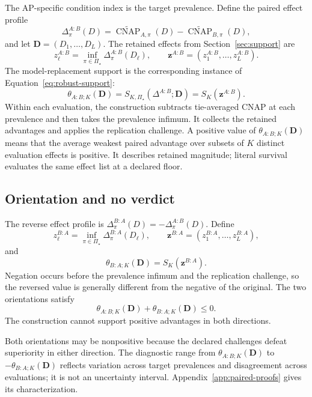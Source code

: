 \documentclass[11pt]{article}
\newcommand{\CNAP}{\operatorname{CNAP}}
\newcommand{\PSet}{\Pi_\star}
\newcommand{\CNAPta}{\widetilde{\CNAP}}
\theoremstyle{remark}
\begin{document}
The AP-specific condition index is the target prevalence. Define the paired effect profile
\[
\Delta^{A:B}_\pi(D)
=
\CNAPta_{A,\pi}(D)
-
\CNAPta_{B,\pi}(D),
\]
and let $\mathbf D=(D_1,\ldots,D_L)$. The retained effects from Section~\ref{sec:support} are
\[
z_\ell^{A:B}
=
\inf_{\pi\in\PSet}\Delta^{A:B}_\pi(D_\ell),
\qquad
\mathbf z^{A:B}
=
(z_1^{A:B},\ldots,z_L^{A:B}).
\]
The model-replacement support is the corresponding instance of Equation~\eqref{eq:robust-support}:
\begin{equation}
\theta_{A:B;K}(\mathbf D)
=
S_{K,\PSet}\!\left(\Delta^{A:B};\mathbf D\right)
=
S_K\!\left(\mathbf z^{A:B}\right).
\label{eq:paired-estimand}
\end{equation}
Within each evaluation, the construction subtracts tie-averaged CNAP at each prevalence and then takes the prevalence infimum. It collects the retained advantages and applies the replication challenge. A positive value of $\theta_{A:B;K}(\mathbf D)$ means that the average weakest paired advantage over subsets of $K$ distinct evaluation effects is positive. It describes retained magnitude; literal survival evaluates the same effect list at a declared floor.

\subsection{Orientation and no verdict}

The reverse effect profile is $\Delta^{B:A}_\pi(D)=-\Delta^{A:B}_\pi(D)$. Define
\[
z_\ell^{B:A}
=
\inf_{\pi\in\PSet}\Delta^{B:A}_\pi(D_\ell),
\qquad
\mathbf z^{B:A}
=
(z_1^{B:A},\ldots,z_L^{B:A}),
\]
and
\[
\theta_{B:A;K}(\mathbf D)
=
S_K\!\left(\mathbf z^{B:A}\right).
\]
Negation occurs before the prevalence infimum and the replication challenge, so the reversed value is generally different from the negative of the original. The two orientations satisfy
\begin{equation}
\theta_{A:B;K}(\mathbf D)+\theta_{B:A;K}(\mathbf D)\leq0.
\label{eq:orientation}
\end{equation}
The construction cannot support positive advantages in both directions.

Both orientations may be nonpositive because the declared challenges defeat superiority in either direction. The diagnostic range from $\theta_{A:B;K}(\mathbf D)$ to $-\theta_{B:A;K}(\mathbf D)$ reflects variation across target prevalences and disagreement across evaluations; it is not an uncertainty interval. Appendix~\ref{app:paired-proofs} gives its characterization.
\end{document}
